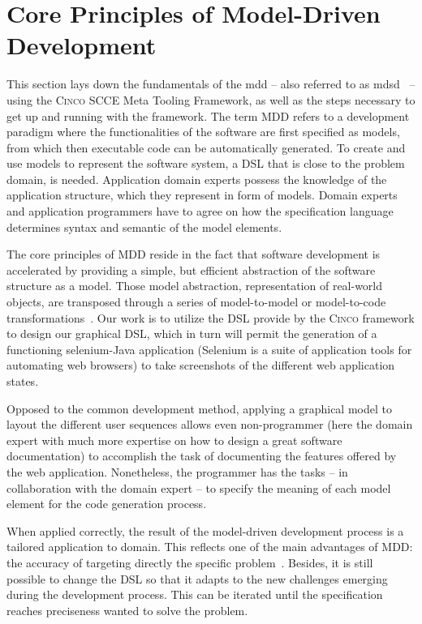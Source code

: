 \section{Core Principles of Model-Driven Development}

This section lays down the fundamentals of the \gls{mdd} -- also referred to as \gls{mdsd}~\cite{fowler} --  using the \textsc{Cinco} SCCE Meta Tooling Framework, as well as the steps necessary to get up and running with the framework. The term MDD refers to a development paradigm where the functionalities of the software are first specified as models, from which then executable code can be automatically generated. To create and use models to represent the software system, a DSL that is close to the problem domain, is needed. Application domain experts possess the knowledge of the application structure, which they represent in form of models. Domain experts and application programmers have to agree on how the specification language determines syntax and semantic of the model elements.

The core principles of MDD reside in the fact that software development is accelerated by providing a simple, but efficient abstraction of the software structure as a model. Those model abstraction, representation of real-world objects, are transposed through a series of model-to-model or model-to-code transformations~\cite{stahl_et_al}. Our work is to utilize the DSL provide by the \textsc{Cinco} framework to design our graphical DSL, which in turn will permit the generation of a functioning \gls*{selenium}-Java application (Selenium is a suite of application tools for automating web browsers) to take screenshots of the different web application states.

Opposed to the common development method, applying a graphical model to layout the different user sequences allows even non-programmer (here the domain expert with much more expertise on how to design a great software documentation) to accomplish the task of documenting the features offered by the web application. Nonetheless, the programmer has the tasks -- in collaboration with the domain expert -- to specify the meaning of each model element for the code generation process. 

When applied correctly, the result of the model-driven development process is a tailored application to domain. This reflects one of the main advantages of MDD: the accuracy of targeting directly the specific problem~\cite{brambilla2017model}. Besides, it is still possible to change the DSL so that it adapts to the new challenges emerging during the development process. This can be iterated until the specification reaches preciseness wanted to solve the problem.


